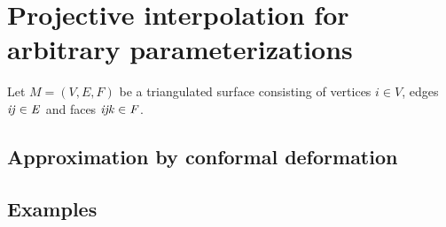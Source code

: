\section[Projective interpolation for arbitrary parameterizations] %
{Projective interpolation for arbitrary parameterizations %
}

Let $M=(V, E, F)$ be a triangulated surface consisting of vertices $i\in V$, edges $\it{ij}\in E$ and faces
$\it{ijk}\in F$.



\subsection{Approximation by conformal deformation}
\subsection{Examples}

